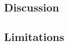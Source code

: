\documentclass{article}
\begin{document}
\subsection{Discussion}

\subsection{Limitations}












\end{document}
